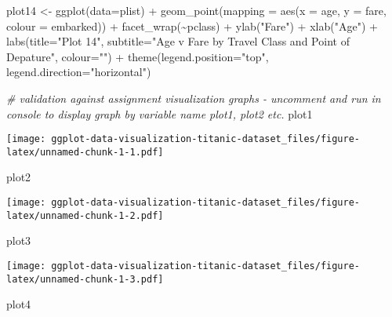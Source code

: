 \documentclass[
]{article}
\newenvironment{Shaded}{\begin{snugshade}}{\end{snugshade}}
\newcommand{\AttributeTok}[1]{\textcolor[rgb]{0.77,0.63,0.00}{#1}}
\newcommand{\CommentTok}[1]{\textcolor[rgb]{0.56,0.35,0.01}{\textit{#1}}}
\newcommand{\FunctionTok}[1]{\textcolor[rgb]{0.00,0.00,0.00}{#1}}
\newcommand{\NormalTok}[1]{#1}
\newcommand{\OtherTok}[1]{\textcolor[rgb]{0.56,0.35,0.01}{#1}}
\newcommand{\SpecialCharTok}[1]{\textcolor[rgb]{0.00,0.00,0.00}{#1}}
\newcommand{\StringTok}[1]{\textcolor[rgb]{0.31,0.60,0.02}{#1}}
\begin{document}
\begin{Shaded}
\begin{Highlighting}[]
\NormalTok{plot14 }\OtherTok{\textless{}{-}} \FunctionTok{ggplot}\NormalTok{(}\AttributeTok{data=}\NormalTok{plist) }\SpecialCharTok{+} \FunctionTok{geom\_point}\NormalTok{(}\AttributeTok{mapping =} \FunctionTok{aes}\NormalTok{(}\AttributeTok{x =}\NormalTok{ age, }\AttributeTok{y =}\NormalTok{ fare, }\AttributeTok{colour =}\NormalTok{ embarked)) }\SpecialCharTok{+} \FunctionTok{facet\_wrap}\NormalTok{(}\SpecialCharTok{\textasciitilde{}}\NormalTok{pclass) }\SpecialCharTok{+} \FunctionTok{ylab}\NormalTok{(}\StringTok{"Fare"}\NormalTok{) }\SpecialCharTok{+} \FunctionTok{xlab}\NormalTok{(}\StringTok{"Age"}\NormalTok{) }\SpecialCharTok{+} \FunctionTok{labs}\NormalTok{(}\AttributeTok{title=}\StringTok{"Plot 14"}\NormalTok{, }\AttributeTok{subtitle=}\StringTok{"Age v Fare by Travel Class and Point of Depature"}\NormalTok{, }\AttributeTok{colour=}\StringTok{""}\NormalTok{) }\SpecialCharTok{+} \FunctionTok{theme}\NormalTok{(}\AttributeTok{legend.position=}\StringTok{"top"}\NormalTok{, }\AttributeTok{legend.direction=}\StringTok{"horizontal"}\NormalTok{)}

\CommentTok{\# validation against assignment visualization graphs {-} uncomment and run in console to display graph by variable name plot1, plot2 etc.}
\NormalTok{plot1}
\end{Highlighting}
\end{Shaded}

\texttt{[image: ggplot-data-visualization-titanic-dataset\_files/figure-latex/unnamed-chunk-1-1.pdf]}

\begin{Shaded}
\begin{Highlighting}[]
\NormalTok{plot2}
\end{Highlighting}
\end{Shaded}

\texttt{[image: ggplot-data-visualization-titanic-dataset\_files/figure-latex/unnamed-chunk-1-2.pdf]}

\begin{Shaded}
\begin{Highlighting}[]
\NormalTok{plot3}
\end{Highlighting}
\end{Shaded}

\texttt{[image: ggplot-data-visualization-titanic-dataset\_files/figure-latex/unnamed-chunk-1-3.pdf]}

\begin{Shaded}
\begin{Highlighting}[]
\NormalTok{plot4}
\end{Highlighting}
\end{Shaded}
\end{document}
